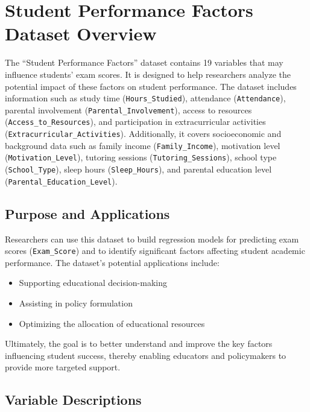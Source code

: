 \documentclass[11pt]{article}
\providecommand{\tightlist}{%
      \setlength{\itemsep}{0pt}\setlength{\parskip}{0pt}}
\begin{document}
    \section{Student Performance Factors Dataset
Overview}\label{student-performance-factors-dataset-overview}

The ``Student Performance Factors'' dataset contains 19 variables that
may influence students' exam scores. It is designed to help researchers
analyze the potential impact of these factors on student performance.
The dataset includes information such as study time
(\texttt{Hours\_Studied}), attendance (\texttt{Attendance}), parental
involvement (\texttt{Parental\_Involvement}), access to resources
(\texttt{Access\_to\_Resources}), and participation in extracurricular
activities (\texttt{Extracurricular\_Activities}). Additionally, it
covers socioeconomic and background data such as family income
(\texttt{Family\_Income}), motivation level
(\texttt{Motivation\_Level}), tutoring sessions
(\texttt{Tutoring\_Sessions}), school type (\texttt{School\_Type}),
sleep hours (\texttt{Sleep\_Hours}), and parental education level
(\texttt{Parental\_Education\_Level}).

\subsection{Purpose and Applications}\label{purpose-and-applications}

Researchers can use this dataset to build regression models for
predicting exam scores (\texttt{Exam\_Score}) and to identify
significant factors affecting student academic performance. The
dataset's potential applications include:

\begin{itemize}
\tightlist
\item
  Supporting educational decision-making
\item
  Assisting in policy formulation
\item
  Optimizing the allocation of educational resources
\end{itemize}

Ultimately, the goal is to better understand and improve the key factors
influencing student success, thereby enabling educators and policymakers
to provide more targeted support.

\subsection{Variable Descriptions}\label{variable-descriptions}
\end{document}
